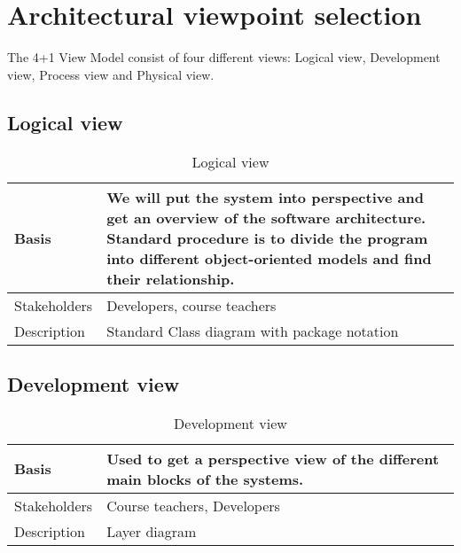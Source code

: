 \newpage
\clearpage

\section{Architectural viewpoint selection}

The 4+1 View Model consist of four different views: Logical view, Development view, Process view and Physical view.

\subsection{Logical view}

\begin{table}[h!]
\begin{tabular}{ | p{90pt} | p{270pt}  |}
\hline
Basis	 & We will put the system into perspective and get an overview of the software architecture. Standard procedure is to divide the program into different object-oriented models and find their relationship.  \\ \hline
Stakeholders & Developers, course teachers\\ \hline 
Description & Standard Class diagram with package notation \\ \hline

\end{tabular}

\caption{Logical view}

\end{table}

\vspace{-20pt}

\subsection{Development view}

\begin{table}[h!]
\begin{tabular}{ | p{90pt} | p{270pt}  |}
\hline
Basis	 & Used to get a perspective view of the different main blocks of the systems. \\ \hline
Stakeholders & Course teachers, Developers\\ \hline 
Description & Layer diagram \\ \hline

\end{tabular}

\caption{Development view}

\end{table}

